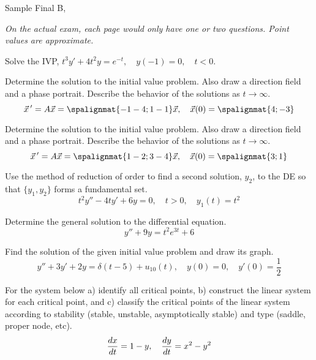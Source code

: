 \documentclass[12pt]{exam}
\newcommand{\TestName}{Sample Final B}
\begin{document}
    

\newpage
    
    \begin{center}
    {\Large \TestName, \Course}
    \end{center}
    

\textit{On the actual exam, each page would only have one or two questions. Point values are approximate.} 
\begin{questions}

    \question[5] %
    Solve the IVP, $t^3 y' + 4t^2 y = e^{-t}, \quad y(-1) = 0 , \quad t<0$.
    

    
    \question[10] %
    Determine the solution to the initial value problem. Also draw a direction field and a phase portrait. Describe the behavior of the solutions as $t \to \infty$.
    $$ \vec x \, ' = A \vec x = \spalignmat{-1 -4 ;1 -1}\vec x, \quad \vec x(0) = \spalignmat{4;-3}$$
    
    
    \question[10] %
    Determine the solution to the initial value problem. Also draw a direction field and a phase portrait. Describe the behavior of the solutions as $t \to \infty$.
    $$ \vec x \, ' = A \vec x = \spalignmat{1 -2;3 -4}\vec x, \quad \vec x(0) = \spalignmat{3;1}$$
    
    
    \question[10] %
    Use the method of reduction of order to find a second solution, $y_2$, to the DE so that $\{y_1,y_2\}$ forms a fundamental set. 
    $$t^2 y'' -4t y' + 6y = 0, \quad t>0, \quad y_1(t) = t^2$$
        
    \question[10] %
    Determine the general solution to the differential equation. 
    $$y'' + 9y = t^2 e^{3t} + 6$$
    
    \question[10] %
    Find the solution of the given initial value problem and draw its graph.
    $$y'' +3y' +2y = \delta (t-5)+ u_{10}(t), \quad y(0) = 0, \quad y'(0) = \frac 1 2$$
    
    \question[10] %
    For the system below a) identify all critical points, b) construct the linear system for each critical point, and c) classify the critical points of the linear system according to stability (stable, unstable, asymptotically stable) and type (saddle, proper node, etc). 
    $${\frac{dx}{dt}} = 1 - y, \quad {\frac{dy}{dt}} = x^2 - y^2$$
    

\end{questions}
\end{document}
